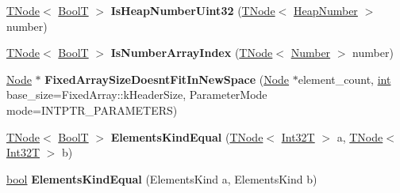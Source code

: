 \begin{DoxyCompactItemize}
\mbox{\hyperlink{classv8_1_1internal_1_1compiler_1_1TNode}{T\+Node}}$<$ \mbox{\hyperlink{structv8_1_1internal_1_1BoolT}{BoolT}} $>$ {\bfseries Is\+Heap\+Number\+Uint32} (\mbox{\hyperlink{classv8_1_1internal_1_1compiler_1_1TNode}{T\+Node}}$<$ \mbox{\hyperlink{classv8_1_1internal_1_1HeapNumber}{Heap\+Number}} $>$ number)
\item 
\mbox{\label{classv8_1_1internal_1_1CodeStubAssembler_ae054e8ae96dc0bff65134befdc0d2dd4}} 
\mbox{\hyperlink{classv8_1_1internal_1_1compiler_1_1TNode}{T\+Node}}$<$ \mbox{\hyperlink{structv8_1_1internal_1_1BoolT}{BoolT}} $>$ {\bfseries Is\+Number\+Array\+Index} (\mbox{\hyperlink{classv8_1_1internal_1_1compiler_1_1TNode}{T\+Node}}$<$ \mbox{\hyperlink{structv8_1_1internal_1_1UnionT}{Number}} $>$ number)
\item 
\mbox{\label{classv8_1_1internal_1_1CodeStubAssembler_aca5d7135599bcbf0cf7b10d0c8f22ffd}} 
\mbox{\hyperlink{classv8_1_1internal_1_1compiler_1_1Node}{Node}} $\ast$ {\bfseries Fixed\+Array\+Size\+Doesnt\+Fit\+In\+New\+Space} (\mbox{\hyperlink{classv8_1_1internal_1_1compiler_1_1Node}{Node}} $\ast$element\+\_\+count, \mbox{\hyperlink{classint}{int}} base\+\_\+size=Fixed\+Array\+::k\+Header\+Size, Parameter\+Mode mode=I\+N\+T\+P\+T\+R\+\_\+\+P\+A\+R\+A\+M\+E\+T\+E\+RS)
\item 
\mbox{\label{classv8_1_1internal_1_1CodeStubAssembler_a03c6e5576e977352e3dcd9025f4d662c}} 
\mbox{\hyperlink{classv8_1_1internal_1_1compiler_1_1TNode}{T\+Node}}$<$ \mbox{\hyperlink{structv8_1_1internal_1_1BoolT}{BoolT}} $>$ {\bfseries Elements\+Kind\+Equal} (\mbox{\hyperlink{classv8_1_1internal_1_1compiler_1_1TNode}{T\+Node}}$<$ \mbox{\hyperlink{structv8_1_1internal_1_1Int32T}{Int32T}} $>$ a, \mbox{\hyperlink{classv8_1_1internal_1_1compiler_1_1TNode}{T\+Node}}$<$ \mbox{\hyperlink{structv8_1_1internal_1_1Int32T}{Int32T}} $>$ b)
\item 
\mbox{\label{classv8_1_1internal_1_1CodeStubAssembler_afcd42c7637344c9ce2bb685917a6a3ce}} 
\mbox{\hyperlink{classbool}{bool}} {\bfseries Elements\+Kind\+Equal} (Elements\+Kind a, Elements\+Kind b)
\item 
\mbox{\label{classv8_1_1internal_1_1CodeStubAssembler_abd61dc55119a32cccd13c2fd759bebde}} 

\end{DoxyCompactItemize}
